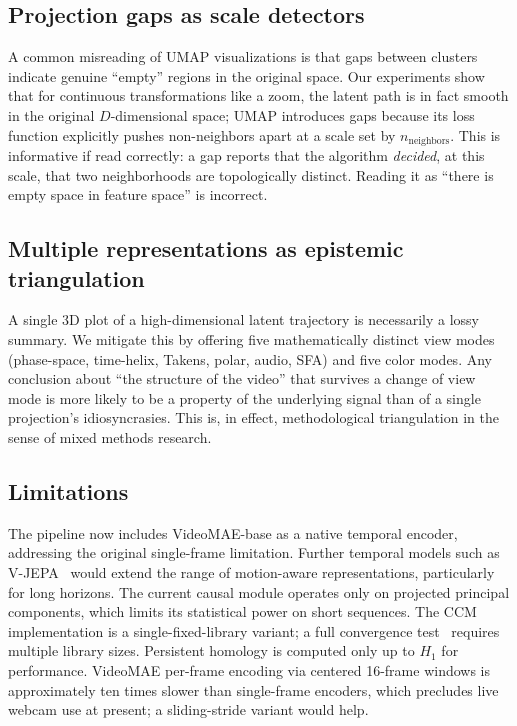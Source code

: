 \documentclass[11pt,a4paper]{article}
\begin{document}
\subsection{Projection gaps as scale detectors}

A common misreading of UMAP visualizations is that gaps between
clusters indicate genuine ``empty'' regions in the original space.
Our experiments show that for continuous transformations like a
zoom, the latent path is in fact smooth in the original
$D$-dimensional space; UMAP introduces gaps because its loss
function explicitly pushes non-neighbors apart at a scale set by
$n_{\text{neighbors}}$. This is informative if read correctly: a
gap reports that the algorithm \emph{decided}, at this scale, that
two neighborhoods are topologically distinct. Reading it as
``there is empty space in feature space'' is incorrect.

\subsection{Multiple representations as epistemic triangulation}

A single 3D plot of a high-dimensional latent trajectory is
necessarily a lossy summary. We mitigate this by offering five
mathematically distinct view modes (phase-space, time-helix,
Takens, polar, audio, SFA) and five color modes. Any conclusion
about ``the structure of the video'' that survives a change of view
mode is more likely to be a property of the underlying signal than
of a single projection's idiosyncrasies. This is, in effect,
methodological triangulation in the sense of mixed methods research.

\subsection{Limitations}

The pipeline now includes VideoMAE-base as a native temporal
encoder, addressing the original single-frame limitation. Further
temporal models such as V-JEPA~\cite{bardes2024vjepa} would extend
the range of motion-aware representations, particularly for long
horizons. The current causal module operates only on projected
principal components, which limits its statistical power on short
sequences. The CCM implementation is a single-fixed-library
variant; a full convergence test~\cite{sugihara2012ccm} requires
multiple library sizes. Persistent homology is computed only up to
$H_1$ for performance. VideoMAE per-frame encoding via centered
16-frame windows is approximately ten times slower than
single-frame encoders, which precludes live webcam use at present;
a sliding-stride variant would help.
\end{document}
